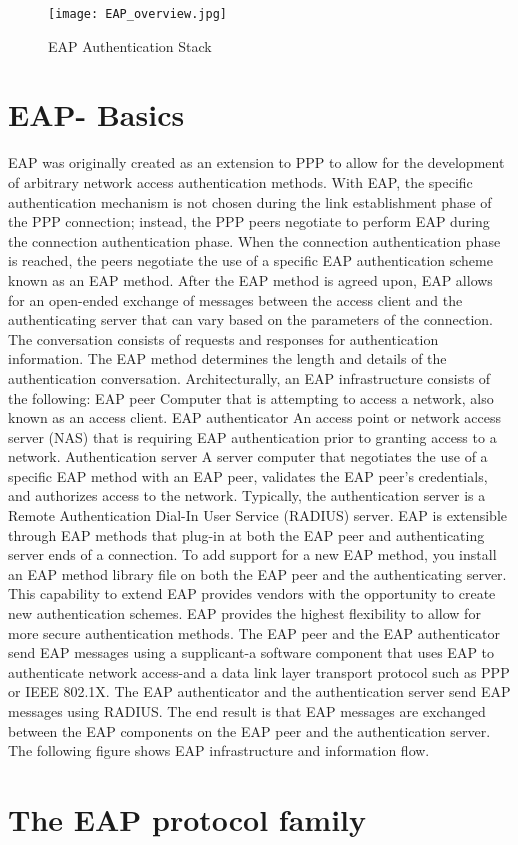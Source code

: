 \begin{figure}[htb]
\centering	
\texttt{[image: EAP\_overview.jpg]}
\caption{EAP Authentication Stack} 
\label{fig:EAP Authentication Stack}
\end{figure}

\section{EAP- Basics}

EAP was originally created as an extension to PPP to allow for the development of arbitrary network access authentication methods. With EAP, the specific authentication mechanism is not chosen during the link establishment phase of the PPP connection; instead, the PPP peers negotiate to perform EAP during the connection authentication phase. When the connection authentication phase is reached, the peers negotiate the use of a specific EAP authentication scheme known as an EAP method. After the EAP method is agreed upon, EAP allows for an open-ended exchange of messages between the access client and the authenticating server that can vary based on the parameters of the connection. The conversation consists of requests and responses for authentication information. The EAP method determines the length and details of the authentication conversation. Architecturally, an EAP infrastructure consists of the following:
EAP peer Computer that is attempting to access a network, also known as an access client. EAP authenticator An access point or network access server (NAS) that is requiring EAP authentication prior to granting access to a network. Authentication server A server computer that negotiates the use of a specific EAP method with an EAP peer, validates the EAP peer's credentials, and authorizes access to the network. Typically, the authentication server is a Remote Authentication Dial-In User Service (RADIUS) server. EAP is extensible through EAP methods that plug-in at both the EAP peer and authenticating server ends of a connection. To add support for a new EAP method, you install an EAP method library file on both the EAP peer and the authenticating server. This capability to extend EAP provides vendors with the opportunity to create new authentication schemes. EAP provides the highest flexibility to allow for more secure authentication methods. The EAP peer and the EAP authenticator send EAP messages using a supplicant-a software component that uses EAP to authenticate network access-and a data link layer transport protocol such as PPP or IEEE 802.1X. The EAP authenticator and the authentication server send EAP messages using RADIUS. The end result is that EAP messages are exchanged between the EAP components on the EAP peer and the authentication server. The following figure shows EAP infrastructure and information flow.



\section{The EAP protocol family}



